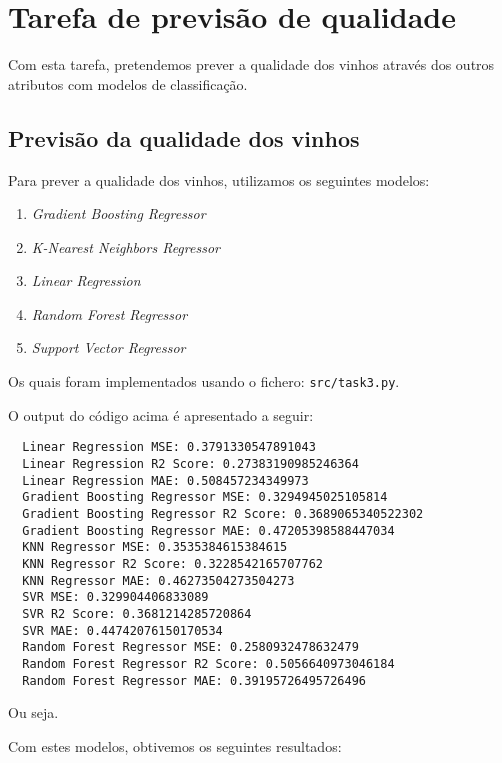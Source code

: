 \documentclass{article}
\begin{document}
\section{Tarefa de previsão de qualidade}

Com esta tarefa, pretendemos prever a qualidade dos vinhos através dos outros atributos com modelos de classificação.

\subsection{Previsão da qualidade dos vinhos}

Para prever a qualidade dos vinhos, utilizamos os seguintes modelos:

\begin{enumerate}
  \item \textit{Gradient Boosting Regressor}
  \item \textit{K-Nearest Neighbors Regressor}
  \item \textit{Linear Regression}
  \item \textit{Random Forest Regressor}
  \item \textit{Support Vector Regressor}
\end{enumerate}

Os quais foram implementados usando o fichero: \texttt{src/task3.py}.

O output do código acima é apresentado a seguir:

\begin{verbatim}
  Linear Regression MSE: 0.3791330547891043
  Linear Regression R2 Score: 0.27383190985246364
  Linear Regression MAE: 0.508457234349973
  Gradient Boosting Regressor MSE: 0.3294945025105814
  Gradient Boosting Regressor R2 Score: 0.3689065340522302
  Gradient Boosting Regressor MAE: 0.47205398588447034
  KNN Regressor MSE: 0.3535384615384615
  KNN Regressor R2 Score: 0.3228542165707762
  KNN Regressor MAE: 0.46273504273504273
  SVR MSE: 0.329904406833089
  SVR R2 Score: 0.3681214285720864
  SVR MAE: 0.44742076150170534
  Random Forest Regressor MSE: 0.2580932478632479
  Random Forest Regressor R2 Score: 0.5056640973046184
  Random Forest Regressor MAE: 0.39195726495726496
\end{verbatim}

Ou seja.

Com estes modelos, obtivemos os seguintes resultados:
\end{document}
